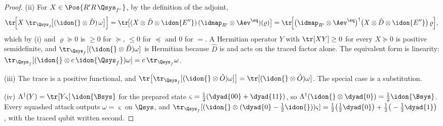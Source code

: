 \begin{proof}
(ii) For $X\in\Pos{R'R\,\Qsys_{f^c}}$, by the definition of the adjoint,
\begin{equation*}
  \tr\!\Big[X\;\tr_{\Qsys_f}\!\big[(\idon{}\otimes\hat D)\,\omega\big]\Big]
  =\tr\!\big[(X\otimes\hat D\otimes\idon{E''})\,
     (\idmap_{R'}\otimes\Aev^{\sq})(\varrho)\big]
  =\tr\!\Big[\big(\idmap_{R'}\otimes\Aev^{\sq}\big)^{\dagger}
     \big(X\otimes\hat D\otimes\idon{E''}\big)\,\varrho\Big] ,
\end{equation*}
which by (i) and $\varrho\succeq0$ is $\ge0$ for $\succeq$, $\le0$ for
$\preceq$ and $0$ for $=$. A Hermitian operator $Y$ with $\tr[XY]\ge0$ for
every $X\succeq0$ is positive semidefinite, and
$\tr_{\Qsys_f}[(\idon{}\otimes\hat D)\omega]$ is Hermitian because $\hat D$
is and acts on the traced factor alone. The equivalent form is linearity:
$\tr_{\Qsys_f}[(\idon{}\otimes c\,\idon{\Qsys_f})\omega]
=c\,\tr_{\Qsys_f}\omega$.

(iii) The trace is a positive functional, and
$\tr\big[\tr_{\Qsys_f}[(\idon{}\otimes\hat O)\omega]\big]
=\tr[(\idon{}\otimes\hat O)\omega]$. The special case is a substitution.

(iv) $\Lambda^{\dagger}(Y)=\tr[Y\varsigma]\,\idon{\Bsys}$ for the prepared
state $\varsigma=\tfrac12(\dyad{00}+\dyad{11})$, so
$\Lambda^{\dagger}(\idon{}\otimes\dyad{0})=\tfrac12\idon{\Bsys}$. Every
squashed attack outputs $\omega=\varsigma$ on $\Qsys$, and
$\tr_{\Qsys_f}[(\idon{}\otimes(\dyad{0}-\tfrac12\idon{}))\varsigma]
=\tfrac12\big(\tfrac12\dyad{0}\big)+\tfrac12\big(-\tfrac12\dyad{1}\big)$,
with the traced qubit written second.
\end{proof}
